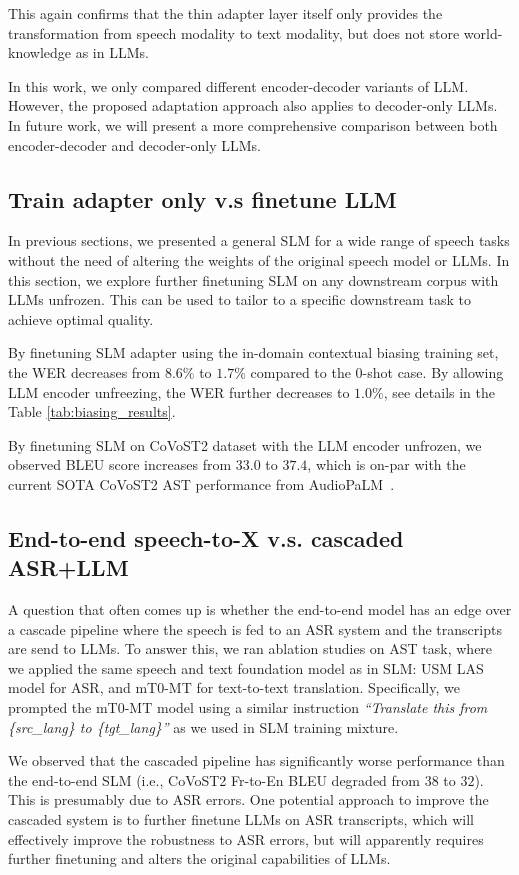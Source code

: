 This again confirms that the thin adapter layer itself only provides the transformation from speech modality to text modality, but does not store world-knowledge as in LLMs.

In this work, we only compared different encoder-decoder variants of LLM. However, the proposed adaptation approach also applies to decoder-only LLMs. In future work, we will present a more comprehensive comparison between both encoder-decoder and decoder-only LLMs.

\subsection{Train adapter only v.s finetune LLM}

In previous sections, we presented a general SLM for a wide range of speech tasks without the need of altering the weights of the original speech model or LLMs. In this section, we explore further finetuning SLM on any downstream corpus with LLMs unfrozen. This can be used to tailor to a specific downstream task to achieve optimal quality.

By finetuning SLM adapter using the in-domain contextual biasing training set, the WER decreases from $8.6\%$ to $1.7\%$ compared to the 0-shot case. By allowing LLM encoder unfreezing, the WER further decreases to $1.0\%$, see details in the Table \ref{tab:biasing_results}.

By finetuning SLM on CoVoST2 dataset with the LLM encoder unfrozen, we observed BLEU score increases from $33.0$ to $37.4$, which is on-par with the current SOTA CoVoST2 AST performance from AudioPaLM~\cite{rubenstein2023audiopalm}.

\subsection{End-to-end speech-to-X v.s. cascaded ASR+LLM}

A question that often comes up is whether the end-to-end model has an edge over a cascade pipeline where the speech is fed to an ASR system and the transcripts are send to LLMs. To answer this, we ran ablation studies on AST task, where we applied the same speech and text foundation model as in SLM: USM LAS model for ASR, and mT0-MT for text-to-text translation. Specifically, we prompted the mT0-MT model using a similar instruction {\em ``Translate this from \{src\_lang\} to \{tgt\_lang\}''} as we used in SLM training mixture.

We observed that the cascaded pipeline has significantly worse performance than the end-to-end SLM (i.e., CoVoST2 Fr-to-En BLEU degraded from $38$ to $32$). This is presumably due to ASR errors. One potential approach to improve the cascaded system is to further finetune LLMs on ASR transcripts, which will effectively improve the robustness to ASR errors, but will apparently requires further finetuning and alters the original capabilities of LLMs.


